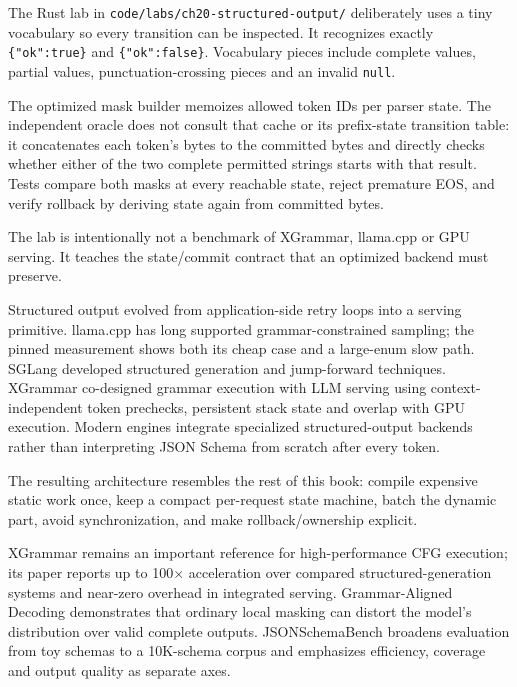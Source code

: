 
The Rust lab in \texttt{code/labs/ch20-structured-output/} deliberately uses a tiny
vocabulary so every transition can be inspected. It recognizes exactly
\texttt{\{"ok":true\}} and \texttt{\{"ok":false\}}. Vocabulary pieces include complete
values, partial values, punctuation-crossing pieces and an invalid \texttt{null}.

The optimized mask builder memoizes allowed token IDs per parser state. The independent
oracle does not consult that cache or its prefix-state transition table: it
concatenates each token's bytes to the committed bytes and directly checks
whether either of the two complete permitted strings starts with that result.
Tests compare both masks at
every reachable state, reject premature EOS, and verify rollback by deriving state
again from committed bytes.

The lab is intentionally not a benchmark of XGrammar, llama.cpp or GPU serving. It
teaches the state/commit contract that an optimized backend must preserve.


Structured output evolved from application-side retry loops into a serving primitive.
llama.cpp has long supported grammar-constrained sampling; the pinned measurement
shows both its cheap case and a large-enum slow path. SGLang developed structured
generation and jump-forward techniques. XGrammar co-designed grammar execution with
LLM serving using context-independent token prechecks, persistent stack state and
overlap with GPU execution. Modern engines integrate specialized structured-output
backends rather than interpreting JSON Schema from scratch after every token.

The resulting architecture resembles the rest of this book: compile expensive static
work once, keep a compact per-request state machine, batch the dynamic part, avoid
synchronization, and make rollback/ownership explicit.


XGrammar remains an important reference for high-performance CFG execution; its paper
reports up to 100$\times$ acceleration over compared structured-generation systems and
near-zero overhead in integrated serving. Grammar-Aligned Decoding demonstrates that
ordinary local masking can distort the model's distribution over valid complete
outputs. JSONSchemaBench broadens evaluation from toy schemas to a 10K-schema corpus
and emphasizes efficiency, coverage and output quality as separate axes.

